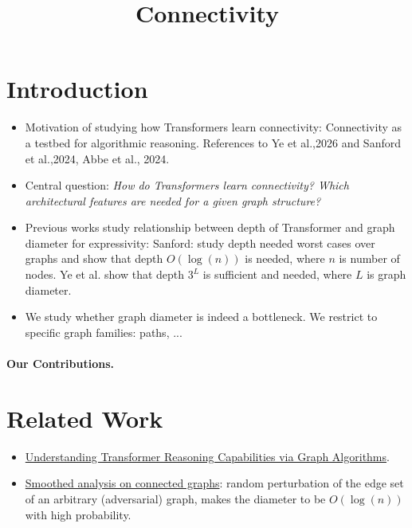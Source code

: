 \documentclass{article}
\title{Connectivity}
\author{}
\date{}
\begin{document}
\begin{abstract}
    
\end{abstract}

\maketitle

\section{Introduction}
\begin{itemize}
    \item Motivation of studying how Transformers learn connectivity: Connectivity as a testbed for algorithmic reasoning. References to Ye et al.,2026 and Sanford et al.,2024, Abbe et al., 2024. 
    \item Central question: \textit{How do Transformers learn connectivity? Which architectural features are needed for a given graph structure? }
    \item Previous works study relationship between depth of Transformer and graph diameter for expressivity: Sanford: study depth needed worst cases over graphs and show that depth $O(\log(n))$ is needed, where $n$ is number of nodes. Ye et al. show that depth $ 3^L $ is sufficient and needed, where $L$ is graph diameter. 
    \item We study whether graph diameter is indeed a bottleneck. We restrict to specific graph families: paths, ...  
\end{itemize}

\paragraph{Our Contributions.}

\section{Related Work}

\begin{itemize}
    \item \href{https://arxiv.org/pdf/2405.18512}{Understanding Transformer Reasoning Capabilities
via Graph Algorithms}.
    \item \href{https://arxiv.org/pdf/1307.4884}{Smoothed analysis on connected graphs}: random perturbation of the edge set of an arbitrary (adversarial) graph, makes the diameter to be $O(\log(n))$ with high probability.
\end{itemize}
\end{document}
